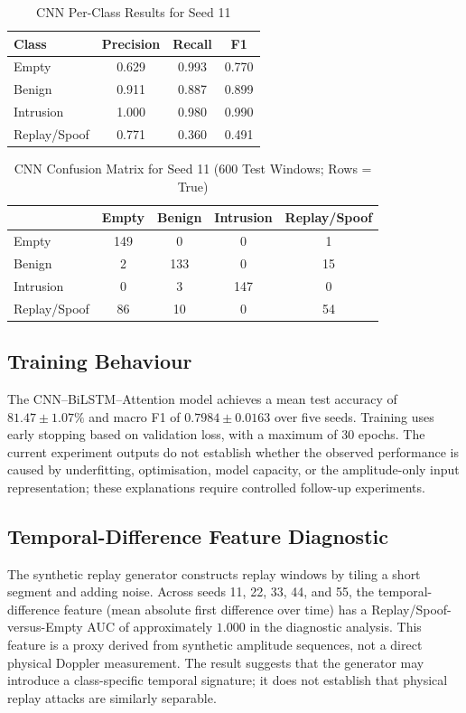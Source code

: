 \documentclass[conference]{IEEEtran}
\begin{document}
\begin{table}[t]
\caption{CNN Per-Class Results for Seed 11}
\label{tab:cnnclass}
\centering
\small
\begin{tabular}{lccc}
\toprule
Class & Precision & Recall & F1 \\
\midrule
Empty & 0.629 & 0.993 & 0.770 \\
Benign & 0.911 & 0.887 & 0.899 \\
Intrusion & 1.000 & 0.980 & 0.990 \\
Replay/Spoof & 0.771 & 0.360 & 0.491 \\
\bottomrule
\end{tabular}
\end{table}

\begin{table}[t]
\caption{CNN Confusion Matrix for Seed 11 (600 Test Windows; Rows = True)}
\label{tab:cm}
\centering
\small
\begin{tabular}{lcccc}
\toprule
 & Empty & Benign & Intrusion & Replay/Spoof \\
\midrule
Empty & 149 & 0 & 0 & 1 \\
Benign & 2 & 133 & 0 & 15 \\
Intrusion & 0 & 3 & 147 & 0 \\
Replay/Spoof & 86 & 10 & 0 & 54 \\
\bottomrule
\end{tabular}
\end{table}

\subsection{Training Behaviour}
The CNN--BiLSTM--Attention model achieves a mean test accuracy of $81.47\pm1.07\%$ and macro F1 of $0.7984\pm0.0163$ over five seeds. Training uses early stopping based on validation loss, with a maximum of 30 epochs. The current experiment outputs do not establish whether the observed performance is caused by underfitting, optimisation, model capacity, or the amplitude-only input representation; these explanations require controlled follow-up experiments.

\subsection{Temporal-Difference Feature Diagnostic}
The synthetic replay generator constructs replay windows by tiling a short segment and adding noise. Across seeds 11, 22, 33, 44, and 55, the temporal-difference feature (mean absolute first difference over time) has a Replay/Spoof-versus-Empty AUC of approximately $1.000$ in the diagnostic analysis. This feature is a proxy derived from synthetic amplitude sequences, not a direct physical Doppler measurement. The result suggests that the generator may introduce a class-specific temporal signature; it does not establish that physical replay attacks are similarly separable.
\end{document}
